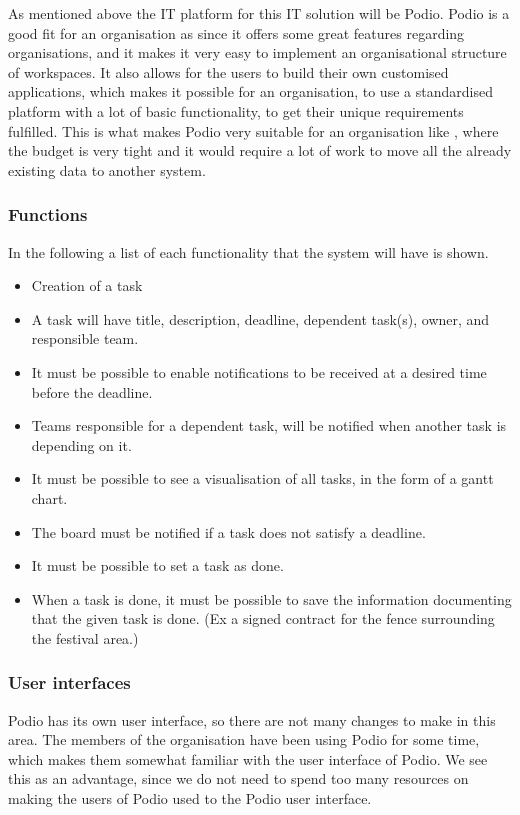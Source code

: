 As mentioned above the IT platform for this IT solution will be Podio. Podio is a good fit for an
organisation as \mil since it offers some great features regarding organisations, and it makes it
very easy to implement an organisational structure of workspaces. It also allows for the users to
build their own customised applications, which makes it possible for an organisation, to use a
standardised platform with a lot of basic functionality, to get their unique requirements fulfilled.
This is what makes Podio very suitable for an organisation like \milNO, where the budget is very
tight and it would require a lot of work to move all the already existing data to another system.

\subsubsection{Functions}
In the following a list of each functionality that the system will have is shown.
\begin{itemize}
    \item Creation of a task
    \item A task will have title, description, deadline, dependent task(s), owner, and responsible
    team.
    \item It must be possible to enable notifications to be received at a desired time before the
    deadline.
    \item Teams responsible for a dependent task, will be notified when another task is depending on
    it.
    \item It must be possible to see a visualisation of all tasks, in the form of a gantt chart.
    \item The board must be notified if a task does not satisfy a deadline.
    \item It must be possible to set a task as done.
    \item When a task is done, it must be possible to save the information documenting that the
    given task is done. (Ex a signed contract for the fence surrounding the festival area.)
\end{itemize}

\subsubsection{User interfaces}
Podio has its own user interface, so there are not many changes to make in this area. The members of
the organisation have been using Podio for some time, which makes them somewhat familiar with the
user interface of Podio. We see this as an advantage, since we do not need to spend too many
resources on making the users of Podio used to the Podio user interface.

